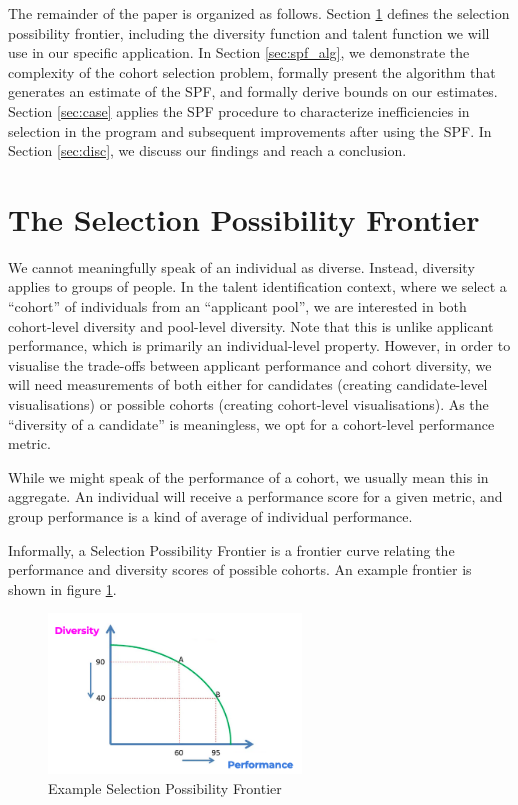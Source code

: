 The remainder of the paper is organized as follows. Section \ref{sec:spf_def} defines the selection possibility frontier, including the diversity function and talent function we will use in our specific application. In Section \ref{sec:spf_alg}, we demonstrate the complexity of the cohort selection problem, formally present the algorithm that generates an estimate of the SPF, and formally derive bounds on our estimates. Section \ref{sec:case} applies the SPF procedure to characterize inefficiencies in selection in the program and subsequent improvements after using the SPF. In Section \ref{sec:disc}, we discuss our findings and reach a conclusion. 

\section{The Selection Possibility Frontier}\label{sec:spf_def}
We cannot meaningfully speak of an individual as diverse. Instead, diversity applies to groups of people. In the talent identification context, where we select a ``cohort'' of individuals from an ``applicant pool'', we are interested in both cohort-level diversity and pool-level diversity. Note that this is unlike applicant performance, which is primarily an individual-level property. However, in order to visualise the trade-offs between applicant performance and cohort diversity, we will need measurements of both either for candidates (creating candidate-level visualisations) or possible cohorts (creating cohort-level visualisations). As the ``diversity of a candidate'' is meaningless, we opt for a cohort-level performance metric.

While we might speak of the performance of a cohort, we usually mean this in aggregate. An individual will receive a performance score for a given metric, and group performance is a kind of average of individual performance.

Informally, a Selection Possibility Frontier is a frontier curve relating the performance and diversity scores of possible cohorts. An example frontier is shown in figure \ref{fig:example_spf}.

\begin{figure}[htb]
    \centering
    \includegraphics[width=0.6\textwidth]{figures/spf/example_spf.png}
    \caption{Example Selection Possibility Frontier}
    \label{fig:example_spf}
\end{figure}

